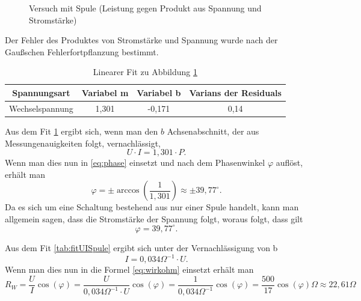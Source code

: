 \begin{figure}[H]
  \centering
  \caption{Versuch mit Spule (Leistung gegen Produkt aus Spannung und Stromstärke)}
  \label{fig:PUISpule}
\end{figure}
Der Fehler des Produktes von Stromstärke und Spannung wurde nach der Gaußschen Fehlerfortpflanzung bestimmt.
\begin{table}[H]
  \centering
  \begin{tabular}{c | c | c | c}
    Spannungsart & Variabel m & Variabel b & Varians der Residuals\\ \hline
    Wechselspannung & 1,301 & -0,171 & 0,14
  \end{tabular}
  \caption{Linearer Fit zu Abbildung \ref{fig:PUISpule}}
  \label{tab:fitPUISpule}
\end{table}
Aus dem Fit \ref{tab:fitPUISpule} ergibt sich, wenn man den $b$ Achsenabschnitt, der aus Messungenauigkeiten folgt, vernachlässigt,
\begin{equation}
U\cdot I=1,301\cdot P.
\end{equation}
Wenn man dies nun in \eqref{eq:phase} einsetzt und nach dem Phasenwinkel $\varphi$ auflöst, erhält man
\begin{equation}
\varphi = \pm \arccos\left(\frac{1}{1{,}301}\right) \approx \pm 39{,}77^\circ.
\end{equation}
Da es sich um eine Schaltung bestehend aus nur einer Spule handelt, kann man allgemein sagen, dass die Stromstärke der Spannung folgt, woraus folgt, dass gilt
\begin{equation}
\varphi = 39,77^\circ.
\end{equation}

Aus dem Fit \ref{tab:fitUISpule} ergibt sich unter der Vernachlässigung von b
\begin{equation}
I=0,034\Omega^{-1}\cdot U.
\end{equation}
Wenn man dies nun in die Formel \eqref{eq:wirkohm} einsetzt erhält man
\begin{equation}
R_W=\frac{U}{I}\cos(\varphi)=\frac{U}{0,034\Omega^{-1}\cdot U}\cos(\varphi)=\frac{1}{0,034\Omega^{-1}}\cos(\varphi)= \frac{500}{17}\cos(\varphi)\Omega \approx 22,61 \Omega
\end{equation}
